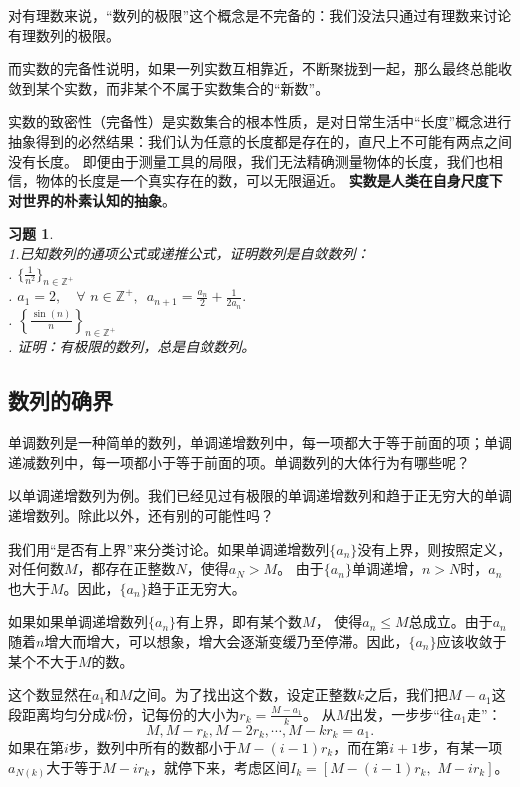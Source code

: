 \documentclass[12pt,UTF8]{ctexbook}
\newtheorem{xt}{习题}[section]
\begin{document}
对有理数来说，“数列的极限”这个概念是不完备的：我们没法只通过有理数来讨论有理数列的极限。

而实数的完备性说明，如果一列实数互相靠近，不断聚拢到一起，那么最终总能收敛到某个实数，而非某个不属于实数集合的“新数”。

实数的致密性（完备性）是实数集合的根本性质，是对日常生活中“长度”概念进行抽象得到的必然结果：我们认为任意的长度都是存在的，直尺上不可能有两点之间没有长度。
即便由于测量工具的局限，我们无法精确测量物体的长度，我们也相信，物体的长度是一个真实存在的数，可以无限逼近。
\textbf{实数是人类在自身尺度下对世界的朴素认知的抽象}。

\begin{xt}
    \mbox{}\\
    \indent 1.已知数列的通项公式或递推公式，证明数列是自敛数列：\\
    . $\{\frac{1}{n^2}\}_{n\in\mathbb{Z}^+}$\\
    . $a_1 = 2, \quad \forall \,\, n\in\mathbb{Z}^+, \,\,\, a_{n+1} = \frac{a_n}{2} + \frac{1}{2a_n}.$\\
    . $\left\{\frac{\sin(n)}{n}\right\}_{n\in\mathbb{Z}^+}$ \\
    . 证明：有极限的数列，总是自敛数列。
\end{xt}

\subsection{数列的确界}
单调数列是一种简单的数列，单调递增数列中，每一项都大于等于前面的项；单调递减数列中，每一项都小于等于前面的项。单调数列的大体行为有哪些呢？

以单调递增数列为例。我们已经见过有极限的单调递增数列和趋于正无穷大的单调递增数列。除此以外，还有别的可能性吗？

我们用“是否有上界”来分类讨论。如果单调递增数列$\{a_n\}$没有上界，则按照定义，对任何数$M$，都存在正整数$N$，使得$a_N > M$。
由于$\{a_n\}$单调递增，$n > N$时，$a_n$也大于$M$。因此，$\{a_n\}$趋于正无穷大。

如果如果单调递增数列$\{a_n\}$有上界，即有某个数$M$，
使得$a_n \leqslant M$总成立。由于$a_n$随着$n$增大而增大，可以想象，增大会逐渐变缓乃至停滞。因此，$\{a_n\}$应该收敛于某个不大于$M$的数。

这个数显然在$a_1$和$M$之间。为了找出这个数，设定正整数$k$之后，我们把$M - a_1$这段距离均匀分成$k$份，记每份的大小为$r_k = \frac{M - a_1}{k}$。
从$M$出发，一步步“往$a_1$走”：
$$ M, M - r_k, M - 2r_k, \cdots, M - k r_k = a_1.$$
如果在第$i$步，数列中所有的数都小于$M - (i-1)r_k$，而在第$i+1$步，有某一项$a_{N(k)}$大于等于$M - i r_k$，就停下来，考虑区间$I_k = [M - (i-1)r_k, \,\, M - i r_k]$。
\end{document}
